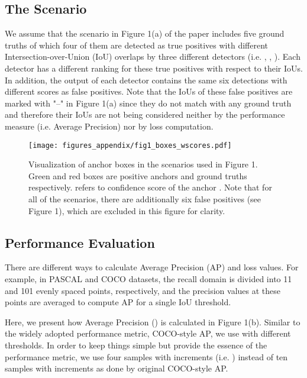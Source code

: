 \documentclass{article}
\begin{document}
\subsection{The Scenario}
\label{subsec:the_scenario}
We assume that the scenario in Figure 1(a) of the paper includes five ground truths of which four of them are detected as true positives with different Intersection-over-Union (IoU) overlaps by three different detectors (i.e. , , ). Each detector has a different ranking for these true positives with respect to their IoUs. In addition, the output of each detector contains the same six detections with different scores as false positives. Note that the IoUs of these false positives are marked with "--" in Figure 1(a) since they do not match with any ground truth and therefore their IoUs are not being considered neither by the performance measure (i.e. Average Precision) nor by loss computation. 


\begin{figure}
\centering
\texttt{[image: figures\_appendix/fig1\_boxes\_wscores.pdf]}
\caption{Visualization of anchor boxes in the scenarios used in Figure 1. Green and red boxes are positive anchors and  ground truths respectively.  refers to confidence score of the anchor . Note that for all of the scenarios, there are additionally six false positives (see Figure 1), which are excluded in this figure for clarity.}
\label{fig:fig_regressors}
\end{figure}


\subsection{Performance Evaluation}
\label{subsec:performance_estimation}
There are different ways to calculate Average Precision (AP) and loss values. For example, in PASCAL \cite{PASCAL} and COCO  \cite{COCO} datasets, the recall domain is divided into 11 and 101 evenly spaced points, respectively, and the  precision values at these points are averaged to compute AP for a single IoU threshold.

Here, we present how Average Precision () is calculated in Figure 1(b). Similar to the widely adopted performance metric, COCO-style AP, we use  with different  thresholds. In order to keep things simple but provide the essence of the performance metric, we use four samples with  increments (i.e. ) instead of ten samples with  increments as done by original COCO-style AP. 
\end{document}

